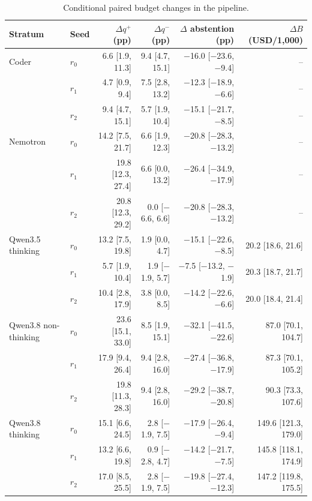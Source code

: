 
\begin{table}[t]
\caption{Conditional paired budget changes in the pipeline.}
\label{tab:bootstrap-budget}
\centering\small\setlength{\tabcolsep}{4pt}
\begin{tabular}{llrrrr}
\toprule
Stratum & Seed & $\Delta q^+$ (pp) & $\Delta q^-$ (pp) & $\Delta$ abstention (pp) & $\Delta B$ (USD/1,000) \\
\midrule
Coder & $r_0$ & 6.6 [1.9, 11.3] & 9.4 [4.7, 15.1] & $-$16.0 [$-$23.6, $-$9.4] & -- \\
 & $r_1$ & 4.7 [0.9, 9.4] & 7.5 [2.8, 13.2] & $-$12.3 [$-$18.9, $-$6.6] & -- \\
 & $r_2$ & 9.4 [4.7, 15.1] & 5.7 [1.9, 10.4] & $-$15.1 [$-$21.7, $-$8.5] & -- \\
Nemotron & $r_0$ & 14.2 [7.5, 21.7] & 6.6 [1.9, 12.3] & $-$20.8 [$-$28.3, $-$13.2] & -- \\
 & $r_1$ & 19.8 [12.3, 27.4] & 6.6 [0.0, 13.2] & $-$26.4 [$-$34.9, $-$17.9] & -- \\
 & $r_2$ & 20.8 [12.3, 29.2] & 0.0 [$-$6.6, 6.6] & $-$20.8 [$-$28.3, $-$13.2] & -- \\
Qwen3.5 thinking & $r_0$ & 13.2 [7.5, 19.8] & 1.9 [0.0, 4.7] & $-$15.1 [$-$22.6, $-$8.5] & 20.2 [18.6, 21.6] \\
 & $r_1$ & 5.7 [1.9, 10.4] & 1.9 [$-$1.9, 5.7] & $-$7.5 [$-$13.2, $-$1.9] & 20.3 [18.7, 21.7] \\
 & $r_2$ & 10.4 [2.8, 17.9] & 3.8 [0.0, 8.5] & $-$14.2 [$-$22.6, $-$6.6] & 20.0 [18.4, 21.4] \\
Qwen3.8 non-thinking & $r_0$ & 23.6 [15.1, 33.0] & 8.5 [1.9, 15.1] & $-$32.1 [$-$41.5, $-$22.6] & 87.0 [70.1, 104.7] \\
 & $r_1$ & 17.9 [9.4, 26.4] & 9.4 [2.8, 16.0] & $-$27.4 [$-$36.8, $-$17.9] & 87.3 [70.1, 105.2] \\
 & $r_2$ & 19.8 [11.3, 28.3] & 9.4 [2.8, 16.0] & $-$29.2 [$-$38.7, $-$20.8] & 90.3 [73.3, 107.6] \\
Qwen3.8 thinking & $r_0$ & 15.1 [6.6, 24.5] & 2.8 [$-$1.9, 7.5] & $-$17.9 [$-$26.4, $-$9.4] & 149.6 [121.3, 179.0] \\
 & $r_1$ & 13.2 [6.6, 19.8] & 0.9 [$-$2.8, 4.7] & $-$14.2 [$-$21.7, $-$7.5] & 145.8 [118.1, 174.9] \\
 & $r_2$ & 17.0 [8.5, 25.5] & 2.8 [$-$1.9, 7.5] & $-$19.8 [$-$27.4, $-$12.3] & 147.2 [119.8, 175.5] \\
\bottomrule
\end{tabular}
\end{table}
